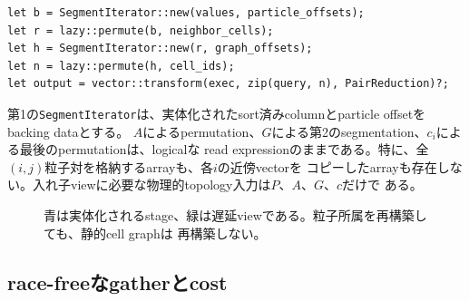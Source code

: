 \documentclass[a4paper,10pt]{ltjsarticle}
\newcommand{\code}[1]{\texttt{#1}}
\begin{document}
\begin{lstlisting}[caption={1個のSPH近傍viewを構築するMassivelyコードの概略。},label={lst:nested-ja}]
let b = SegmentIterator::new(values, particle_offsets);
let r = lazy::permute(b, neighbor_cells);
let h = SegmentIterator::new(r, graph_offsets);
let n = lazy::permute(h, cell_ids);
let output = vector::transform(exec, zip(query, n), PairReduction)?;
\end{lstlisting}

第1の\code{SegmentIterator}は、実体化されたsort済みcolumnとparticle offsetをbacking dataとする。
$A$によるpermutation、$G$による第2のsegmentation、$c_i$による最後のpermutationは、logicalな
read expressionのままである。特に、全$(i,j)$粒子対を格納するarrayも、各$i$の近傍vectorを
コピーしたarrayも存在しない。入れ子viewに必要な物理的topology入力は$P$、$A$、$G$、$c$だけで
ある。

\begin{figure}[H]
  \centering
  \caption{青は実体化されるstage、緑は遅延viewである。粒子所属を再構築しても、静的cell graphは
  再構築しない。}
  \label{fig:neighborhood-ja}
\end{figure}

\subsection{race-freeなgatherとcost}
\end{document}
